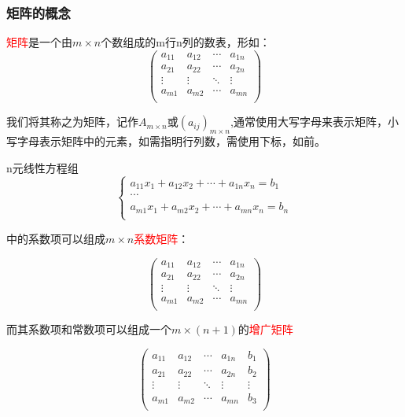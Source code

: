 \subsubsection{矩阵的概念}

\begin{information}
	\textcolor{red}{矩阵}是一个由$m\times n$个数组成的m行n列的数表，形如：
	$$
	\begin{pmatrix}
	a_{11} &a_{12}&\cdots&a_{1n}\\
	a_{21}&a_{22}&\cdots&a_{2n}\\
	\vdots&\vdots&\ddots&\vdots\\
	a_{m1}&a_{m2}&\cdots&a_{mn}\\
	\end{pmatrix}
	$$

	我们将其称之为矩阵，记作$A_{m\times n}$或$(a_{ij})_{m\times n}$,通常使用大写字母来表示矩阵，小写字母表示矩阵中的元素，如需指明行列数，需使用下标，如前。
\end{information}

n元线性方程组
$$
\begin{cases}
	a_{11}x_1+a_{12}{x_2}+\cdots+a_{1n}x_n=b_1\\
	\cdots\\
	a_{m1}x_1+a_{m2}x_2+\cdots+a_{mn}x_n=b_n\\
\end{cases}
$$

中的系数项可以组成$m\times n$\textcolor{red}{系数矩阵}：

	$$
\begin{pmatrix}
	a_{11} &a_{12}&\cdots&a_{1n}\\
	a_{21}&a_{22}&\cdots&a_{2n}\\
	\vdots&\vdots&\ddots&\vdots\\
	a_{m1}&a_{m2}&\cdots&a_{mn}\\
\end{pmatrix}
$$

而其系数项和常数项可以组成一个$m\times (n+1)$的\textcolor{red}{增广矩阵}

	$$
\begin{pmatrix}
	a_{11} &a_{12}&\cdots&a_{1n}&b_1\\
	a_{21}&a_{22}&\cdots&a_{2n}&b_2\\
	\vdots&\vdots&\ddots&\vdots&\vdots\\
	a_{m1}&a_{m2}&\cdots&a_{mn}&b_3\\
\end{pmatrix}
$$


